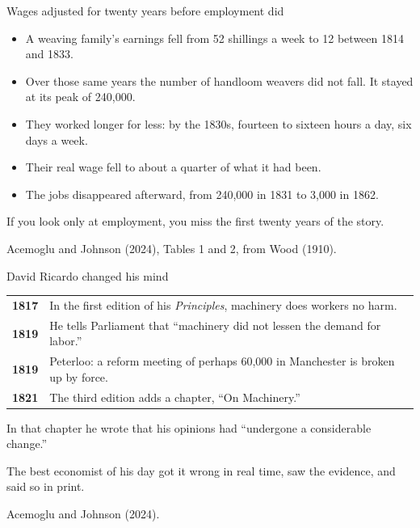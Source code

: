 \documentclass[aspectratio=169,11pt]{beamer}
\begin{document}
\begin{frame}{Wages adjusted for twenty years before employment did}

\begin{itemize}\setlength\itemsep{0.4em}
    \item A weaving family's earnings fell from 52 shillings a week to 12 between 1814 and 1833.
    \item Over those same years the number of handloom weavers did not fall. It stayed at its peak of 240,000.
    \item They worked longer for less: by the 1830s, fourteen to sixteen hours a day, six days a week.
    \item Their real wage fell to about a quarter of what it had been.
    \item The jobs disappeared afterward, from 240,000 in 1831 to 3,000 in 1862.
\end{itemize}

\vspace{0.35cm}

\alert{If you look only at employment, you miss the first twenty years of the story.}

\vspace{0.05cm}
{\scriptsize\color{warmgray}Acemoglu and Johnson (2024), Tables 1 and 2, from Wood (1910).}

\end{frame}

\begin{frame}{David Ricardo changed his mind}

\begin{center}
\footnotesize
\begin{tabular}{@{}ll@{}}
\toprule
\textbf{1817} & In the first edition of his \emph{Principles}, machinery does workers no harm. \\
\textbf{1819} & He tells Parliament that ``machinery did not lessen the demand for labor.'' \\
\textbf{1819} & Peterloo: a reform meeting of perhaps 60,000 in Manchester is broken up by force. \\
\textbf{1821} & The third edition adds a chapter, ``On Machinery.'' \\
\bottomrule
\end{tabular}
\end{center}

\vspace{0.3cm}

In that chapter he wrote that his opinions had ``undergone a considerable change.''

\vspace{0.3cm}

\alert{The best economist of his day got it wrong in real time, saw the evidence, and said so in print.}

\vspace{0.05cm}
{\scriptsize\color{warmgray}Acemoglu and Johnson (2024).}

\end{frame}
\end{document}
